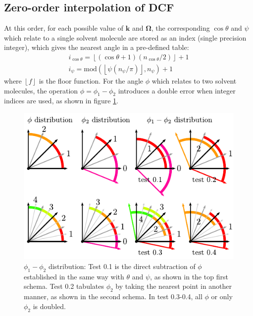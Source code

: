 \subsection{Zero-order interpolation of DCF\label{subsec:Zero-order-interpolation-of}}

At this order, for each possible value of $\mathbf{k}$ and $\mathbf{\Omega}$,
the corresponding $\cos\theta$ and $\psi$ which relate to a single
solvent molecule are stored as an index (single precision integer),
which gives the nearest angle in a pre-defined table:
\begin{equation}
\begin{array}{l}
i_{\cos\theta}=\left\lfloor (\cos\theta+1)(n_{\cos\theta}/2)\right\rfloor +1\\
i_{\psi}=\mathrm{mod}(\left\lfloor \psi(n_{\psi}/\pi)\right\rfloor ,n_{\psi})+1
\end{array}
\end{equation}
where $\left\lfloor f\right\rfloor $ is the floor function. For the
angle $\phi$ which relates to two solvent molecules, the operation
$\phi=\phi_{1}-\phi_{2}$ introduces a double error when integer indices
are used, as shown in figure \ref{fig:diff_phi}.

\begin{figure}[h]
\begin{centering}
\includegraphics{_figure/diff_phi}
\par\end{centering}
\caption[$\phi_{1}-\phi_{2}$ distribution]{$\phi_{1}-\phi_{2}$ distribution: Test 0.1 is the direct subtraction
of $\phi$ established in the same way with $\theta$ and $\psi$,
as shown in the top first schema. Test 0.2 tabulates $\phi_{2}$ by
taking the nearest point in another manner, as shown in the second
schema. In test 0.3-0.4, all $\phi$ or only $\phi_{2}$ is doubled.\label{fig:diff_phi}}
\end{figure}

